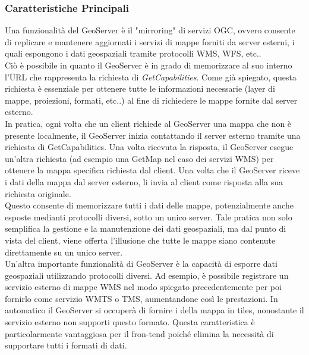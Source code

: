 \subsubsection{Caratteristiche Principali}

Una funzionalità del GeoServer è il "mirroring" di servizi OGC, ovvero consente di replicare e mantenere aggiornati i servizi di mappe forniti da server esterni, i quali espongono i dati geospaziali tramite protocolli WMS, WFS, etc..
\\Ciò è possibile in quanto il GeoServer è in grado di memorizzare al suo interno l'URL che rappresenta la richiesta di \textit{GetCapabilities}. Come già spiegato, questa richiesta è essenziale per ottenere tutte le informazioni necessarie (layer di mappe, proiezioni, formati, etc..) al fine di richiedere le mappe fornite dal server esterno.
\\In pratica, ogni volta che un client richiede al GeoServer una mappa che non è presente localmente, il GeoServer inizia contattando il server esterno tramite una richiesta di GetCapabilities. Una volta ricevuta la risposta, il GeoServer esegue un'altra richiesta (ad esempio una GetMap nel caso dei servizi WMS) per ottenere la mappa specifica richiesta dal client. Una volta che il GeoServer riceve i dati della mappa dal server esterno, li invia al client come risposta alla sua richiesta originale.
\\Questo consente di memorizzare tutti i dati delle mappe, potenzialmente anche esposte medianti protocolli diversi, sotto un unico server. Tale pratica non solo semplifica la gestione e la manutenzione dei dati geospaziali, ma dal punto di vista del client, viene offerta l'illusione che tutte le mappe siano contenute direttamente su un unico server.
\\Un'altra importante funzionalità di GeoServer è la capacità di esporre dati geospaziali utilizzando protocolli diversi. Ad esempio, è possibile registrare un servizio esterno di mappe WMS nel modo spiegato precedentemente per poi fornirlo come servizio WMTS o TMS, aumentandone così le prestazioni. In automatico il GeoServer si occuperà di fornire i della mappa in tiles, nonostante il servizio esterno non supporti questo formato. Questa caratteristica è particolarmente vantaggiosa per il fron-tend poiché elimina la necessità di supportare tutti i formati di dati.

